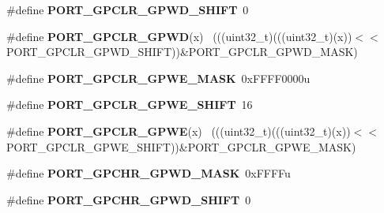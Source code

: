 \begin{DoxyCompactItemize}
\item 
\hypertarget{group___p_o_r_t___register___masks_gaafacaac0aa215f596b947609857d6491}{}\#define {\bfseries P\+O\+R\+T\+\_\+\+G\+P\+C\+L\+R\+\_\+\+G\+P\+W\+D\+\_\+\+S\+H\+I\+F\+T}~0\label{group___p_o_r_t___register___masks_gaafacaac0aa215f596b947609857d6491}

\item 
\hypertarget{group___p_o_r_t___register___masks_gab9daa192b3e0c7d1bf44689b960c5a4f}{}\#define {\bfseries P\+O\+R\+T\+\_\+\+G\+P\+C\+L\+R\+\_\+\+G\+P\+W\+D}(x)                                          ~(((uint32\+\_\+t)(((uint32\+\_\+t)(x))$<$$<$P\+O\+R\+T\+\_\+\+G\+P\+C\+L\+R\+\_\+\+G\+P\+W\+D\+\_\+\+S\+H\+I\+F\+T))\&P\+O\+R\+T\+\_\+\+G\+P\+C\+L\+R\+\_\+\+G\+P\+W\+D\+\_\+\+M\+A\+S\+K)\label{group___p_o_r_t___register___masks_gab9daa192b3e0c7d1bf44689b960c5a4f}

\item 
\hypertarget{group___p_o_r_t___register___masks_ga49c4160370859546837be80a2eed1365}{}\#define {\bfseries P\+O\+R\+T\+\_\+\+G\+P\+C\+L\+R\+\_\+\+G\+P\+W\+E\+\_\+\+M\+A\+S\+K}~0x\+F\+F\+F\+F0000u\label{group___p_o_r_t___register___masks_ga49c4160370859546837be80a2eed1365}

\item 
\hypertarget{group___p_o_r_t___register___masks_ga340d6aadd9516b3cac26187b014ce9d3}{}\#define {\bfseries P\+O\+R\+T\+\_\+\+G\+P\+C\+L\+R\+\_\+\+G\+P\+W\+E\+\_\+\+S\+H\+I\+F\+T}~16\label{group___p_o_r_t___register___masks_ga340d6aadd9516b3cac26187b014ce9d3}

\item 
\hypertarget{group___p_o_r_t___register___masks_ga82584460ead116af92e0d8d2ce15a88e}{}\#define {\bfseries P\+O\+R\+T\+\_\+\+G\+P\+C\+L\+R\+\_\+\+G\+P\+W\+E}(x)                                          ~(((uint32\+\_\+t)(((uint32\+\_\+t)(x))$<$$<$P\+O\+R\+T\+\_\+\+G\+P\+C\+L\+R\+\_\+\+G\+P\+W\+E\+\_\+\+S\+H\+I\+F\+T))\&P\+O\+R\+T\+\_\+\+G\+P\+C\+L\+R\+\_\+\+G\+P\+W\+E\+\_\+\+M\+A\+S\+K)\label{group___p_o_r_t___register___masks_ga82584460ead116af92e0d8d2ce15a88e}

\item 
\hypertarget{group___p_o_r_t___register___masks_ga4f288d1140184d41384f459c263d6e63}{}\#define {\bfseries P\+O\+R\+T\+\_\+\+G\+P\+C\+H\+R\+\_\+\+G\+P\+W\+D\+\_\+\+M\+A\+S\+K}~0x\+F\+F\+F\+Fu\label{group___p_o_r_t___register___masks_ga4f288d1140184d41384f459c263d6e63}

\item 
\hypertarget{group___p_o_r_t___register___masks_gab4464bb98b737fbf75d42682fef3c09c}{}\#define {\bfseries P\+O\+R\+T\+\_\+\+G\+P\+C\+H\+R\+\_\+\+G\+P\+W\+D\+\_\+\+S\+H\+I\+F\+T}~0\label{group___p_o_r_t___register___masks_gab4464bb98b737fbf75d42682fef3c09c}


\end{DoxyCompactItemize}
